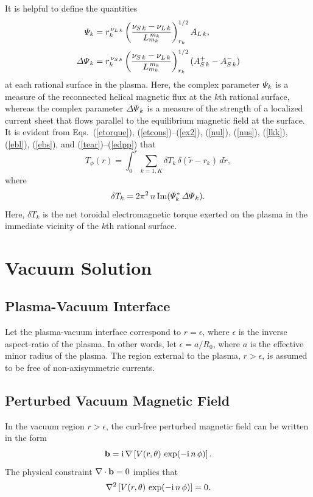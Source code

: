 \documentclass[12pt,prb,aps]{revtex4-1}
\begin{document}
It is helpful to define the quantities\,\cite{am1}
\begin{align}\label{Psidef}
{\mit\Psi}_k&= r_k^{\,\nu_{L\,k}}\left(\frac{\nu_{S\,k}-\nu_{L\,k}}{L_{m_k}^{\,{m_k}}}\right)^{1/2}_{r_k} A_{L\,k},\\[0.5ex]
{\mit\Delta\Psi}_k &= r_k^{\,\nu_{S\,k}}\left(\frac{\nu_{S\,k}-\nu_{L\,k}}{L_{m_k}^{\,m_k}}\right)^{1/2}_{r_k} (A_{S\,k}^+ - A_{S\,k}^-)\label{edpp}
\end{align}
at each rational surface in the plasma. Here, the complex parameter ${\mit\Psi}_k$ is a measure of the reconnected helical magnetic flux at the $k$th rational surface, whereas
the complex parameter ${\mit\Delta\Psi}_k$ is a measure of the strength of a localized current sheet that flows parallel to the equilibrium magnetic field at the surface. 
It is evident from Eqs.~(\ref{etorque}), (\ref{etcons})--(\ref{ex2}), (\ref{nul}), (\ref{nus}), (\ref{lkk}), (\ref{ebl}), (\ref{ebs}), and (\ref{tear})--(\ref{edpp}) that\,\cite{am1,am3}
\begin{equation}\label{e204z}
T_\phi(r) =\int_0^r \sum_{k=1,K}\delta T_k\,\delta(\tilde{r}-r_k)\,d\tilde{r},
\end{equation}
where
\begin{equation}\label{e194t}
\delta T_k = 2\pi^2\,n\,{\rm Im}({\mit\Psi}_k^\ast\,{\mit\Delta\Psi}_k).
\end{equation}
Here, $\delta T_k$ is the net toroidal electromagnetic torque exerted on the plasma in the immediate vicinity of the $k$th rational
surface. 

\section{Vacuum Solution}\label{vacxx}

\subsection{Plasma-Vacuum Interface}
Let the plasma-vacuum interface  correspond to $r=\epsilon$, where  $\epsilon$ is the inverse aspect-ratio of the
plasma. In other words, let $\epsilon=a/R_0$, where $a$ is the effective minor radius of the plasma. 
The region external to the plasma, $r>\epsilon$, is assumed to be  free of non-axisymmetric currents.

\subsection{Perturbed Vacuum Magnetic Field}\label{pertb}
In the vacuum region $r>\epsilon$, the curl-free perturbed magnetic field can be written in the form\,\cite{am1}
\begin{equation}\label{vdef}
{\bf b} = {\rm i}\,\nabla\left[ V(r,\theta)\,\exp(-{\rm i}\,n\,\phi)\right].
\end{equation}
The physical constraint $\nabla\cdot {\bf b} =0$ implies that
\begin{equation}\label{elaplace}
\nabla^2 \left[V(r,\theta)\,\exp(-{\rm i}\,n\,\phi)\right]= 0.
\end{equation}
\end{document}
